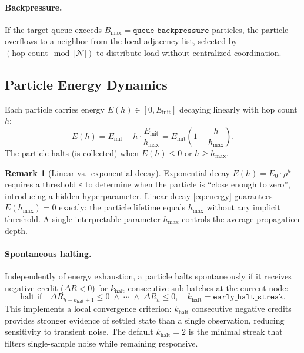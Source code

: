 \documentclass[11pt,a4paper]{article}
\theoremstyle{definition}
\newtheorem{remark}{Remark}[section]
\begin{document}
\paragraph{Backpressure.}
If the target queue exceeds $B_\text{max} = \texttt{queue\_backpressure}$ particles,
the particle overflows to a neighbor from the local adjacency list, selected by
$(\text{hop\_count} \mod |\mathcal{N}|)$ to distribute load without centralized coordination.

\subsection{Particle Energy Dynamics}
\label{sec:energy}

Each particle carries energy $E(h) \in [0, E_\text{init}]$ decaying linearly with hop count $h$:
\begin{equation}
  E(h) = E_\text{init} - h \cdot \frac{E_\text{init}}{h_\text{max}} = E_\text{init}\!\left(1 - \frac{h}{h_\text{max}}\right).
  \label{eq:energy}
\end{equation}
The particle halts (is collected) when $E(h) \le 0$ or $h \ge h_\text{max}$.

\begin{remark}[Linear vs.\ exponential decay]
  Exponential decay $E(h) = E_0 \cdot \rho^h$ requires a threshold $\varepsilon$ to determine
  when the particle is ``close enough to zero'', introducing a hidden hyperparameter.
  Linear decay \eqref{eq:energy} guarantees $E(h_\text{max}) = 0$ exactly: the particle lifetime
  equals $h_\text{max}$ without any implicit threshold.
  A single interpretable parameter $h_\text{max}$ controls the average propagation depth.
\end{remark}

\paragraph{Spontaneous halting.}
Independently of energy exhaustion, a particle halts spontaneously if it receives negative
credit ($\Delta R < 0$) for $k_\text{halt}$ consecutive sub-batches at the current node:
\begin{equation}
  \text{halt if} \quad \Delta R_{h-k_\text{halt}+1} \le 0 \;\wedge\; \cdots \;\wedge\; \Delta R_h \le 0,
  \quad k_\text{halt} = \texttt{early\_halt\_streak}.
  \label{eq:spontaneous}
\end{equation}
This implements a local convergence criterion: $k_\text{halt}$ consecutive negative credits
provides stronger evidence of settled state than a single observation, reducing sensitivity to
transient noise. The default $k_\text{halt} = 2$ is the minimal streak that filters single-sample
noise while remaining responsive.
\end{document}
